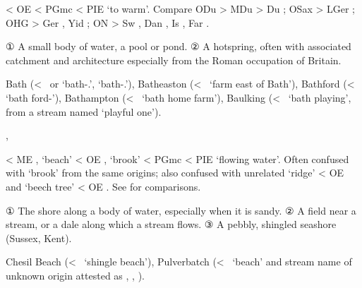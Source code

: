 \documentclass[12pt,letterpaper,oneside,article,draft]{memoir}
\begin{document}
\begin{Lemma}
\begin{Etymology}
	< OE  < PGmc  < PIE  ‘to warm’.
	Compare
	ODu  > MDu  > Du ;
	OSax  > LGer ;
	OHG  > Ger , Yid  ;
	ON  > Sw , Dan , Is , Far .
\end{Etymology}
\begin{Definitions}
	① A small body of water, a pool or pond.
	② A hotspring, often with associated catchment and architecture especially from the Roman occupation of Britain.
\end{Definitions}
\begin{Examples}
	Bath (<~ or  ‘bath-.’,  ‘bath-.’), Batheaston (<~ ‘farm east of Bath’), Bathford (<~ ‘bath ford-’), Bathampton (<~ ‘bath home farm’), Baulking (<~ ‘bath playing’, from a stream named  ‘playful one’).
\end{Examples}
\end{Lemma}

\begin{Lemma}
\begin{Also}
	, 
\end{Also}
\begin{Etymology}
	< ME ,  ‘beach’ < OE ,  ‘brook’ < PGmc 
		< PIE  ‘flowing water’.
	Often confused with  ‘brook’ from the same origins; also confused with unrelated
		 ‘ridge’ < OE  and  ‘beech tree’ < OE .
	See  for comparisons.
\end{Etymology}
\begin{Definitions}
	① The shore along a body of water, especially when it is sandy.
	② A field near a stream, or a dale along which a stream flows.
	③ A pebbly, shingled seashore (Sussex, Kent).
\end{Definitions}
\begin{Examples}
	Chesil Beach (<~ ‘shingle beach’), Pulverbatch (<~ ‘beach’ and stream name of unknown origin attested as , , ). 
\end{Examples}
\end{Lemma}
\end{document}
